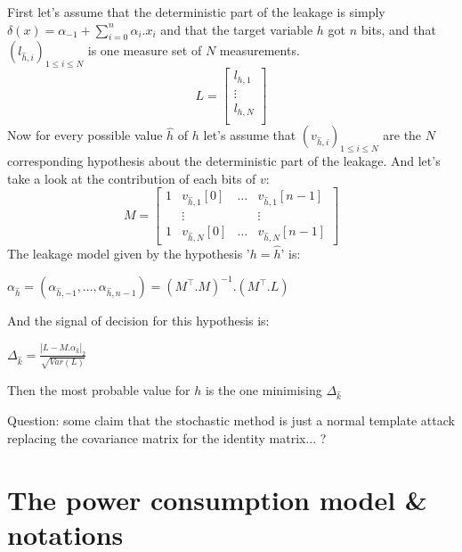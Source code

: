 First let's assume that  the deterministic part of the leakage is simply
$\delta(x) = \alpha_{-1}  + \sum \limits_{i=0}^{n} \alpha_i.x_i $ and that the target variable $h$ got $n$ bits, 
 and that $ \left( l_{\hat{h},i}\right)_{1 \leq i \leq N}$ is one measure set of $N$ measurements.
 				\begin{equation*}
				L = 
				\begin{bmatrix}
				l_{{h},1}\\
				\vdots\\
				l_{{h},N}\\
				\end{bmatrix}
				\end{equation*}
Now for every possible value $\hat{h}$ of $h$ let's assume that
$ \left( v_{\hat{h},i}\right)_{1 \leq i \leq N}$ are the $N$ corresponding hypothesis about the deterministic 
part of the leakage. And let's take a look at the contribution of each bits of $v$:
				\begin{equation*}
				M = 
				\begin{bmatrix}
				1 & v_{\hat{h},1}[0]  &\ldots & v_{\hat{h},1}[n-1] \\
				  & \vdots &          & \vdots \\
				1 & v_{\hat{h},N}[0]  &\ldots & v_{\hat{h},N}[n-1]
				\end{bmatrix}
				\end{equation*}
The leakage model given by the hypothesis '$h = \hat{h}$' is:
\begin{center}
$\alpha_{\hat{h}} = (\alpha_{\hat{h},{-1}}, \hdots , \alpha_{\hat{h},{n-1}}) = ( M^\top .M)^{-1} . (M^\top .L)$
\end{center}
And the signal of decision for this hypothesis is:
\begin{center}
$\Delta_{\hat{k}}  = \frac{|L-M.\alpha_{\hat{k}}|_2}{\sqrt{Var(L)}} $
\end{center}
Then the most probable value for $h$ is the one minimising  $\Delta_{\hat{k}}  $

Question: some claim that the stochastic method is just a normal template attack replacing
the covariance matrix for the identity matrix... ?

\newpage
\section{The power consumption model \& notations}

